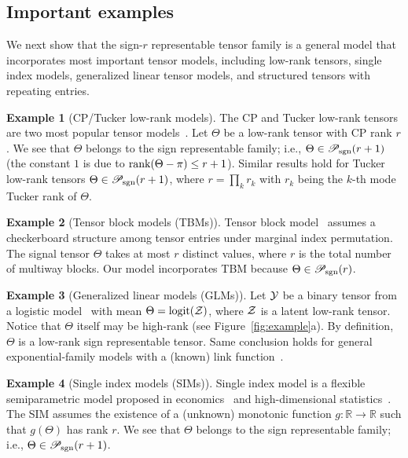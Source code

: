 \documentclass[twoside,11pt]{article}
\theoremstyle{definition}
\newtheorem{example}{Example}
\def\rank{\textup{rank}}
\def\caliP{\mathscr{P}_{\textup{sgn}}}
\begin{document}
\subsection{Important examples}\label{sec:common}
We next show that the sign-$r$ representable tensor family is a general model that incorporates most important tensor models, including low-rank tensors, single index models, generalized linear tensor models, and structured tensors with repeating entries. 

\begin{example}[CP/Tucker low-rank models] The CP and Tucker low-rank tensors are two most popular tensor models~\citep{kolda2009tensor}. Let $\Theta$ be a low-rank tensor with CP rank $r$. We see that $\Theta$ belongs to the sign representable family; i.e., $\Theta\in\caliP(r+1)$ (the constant $1$ is due to $\rank(\Theta-\pi)\leq r+1$). Similar results hold for Tucker low-rank tensors $\Theta\in\caliP(r+1)$, where $r=\prod_kr_k$ with $r_k$ being the $k$-th mode Tucker rank of $\Theta$.  
\end{example} 
\begin{example}[Tensor block models (TBMs)] Tensor block model~\citep{wang2019multiway,chi2020provable} assumes a checkerboard structure among tensor entries under marginal index permutation. The signal tensor $\Theta$ takes at most $r$ distinct values, where $r$ is the total number of multiway blocks. Our model incorporates TBM because $\Theta \in \caliP(r)$. 
\end{example}

\begin{example}[Generalized linear models (GLMs)] Let $\mathcal{Y}$ be a binary tensor from a logistic model~\citep{wang2018learning} with mean $\Theta=\text{logit}(\mathcal{Z})$, where $\mathcal{Z}$ is a latent low-rank tensor. Notice that $\Theta$ itself may be high-rank (see Figure~\ref{fig:example}a). By definition, $\Theta$ is a low-rank sign representable tensor. Same conclusion holds for general exponential-family models with a (known) link function~\citep{hong2020generalized}. 
\end{example}

\begin{example}[Single index models (SIMs)] Single index model is a flexible semiparametric model proposed in economics~\citep{robinson1988root} and high-dimensional statistics~\citep{balabdaoui2019least,ganti2017learning}. The SIM assumes the existence of a (unknown) monotonic function $g\colon \mathbb{R}\to \mathbb{R}$ such that $g(\Theta)$ has rank $r$. We see that $\Theta$ belongs to the sign representable family; i.e., $\Theta\in \caliP(r+1)$. 
\end{example}
\end{document}
